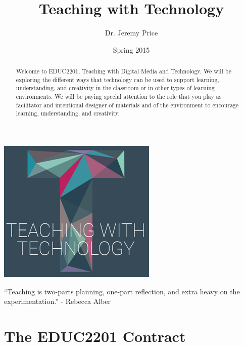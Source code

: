 \documentclass{tufte-handout}
\title{Teaching with Technology}
\author{Dr. Jeremy Price}
\date{Spring 2015}  %
\begin{document}
\maketitle%


\begin{abstract}
Welcome to EDUC2201, Teaching with Digital Media and Technology. We will be exploring the different ways that technology can be used to support learning, understanding, and creativity in the classroom or in other types of learning environments. We will be paying special attention to the role that you play as facilitator and intentional designer of materials and of the environment to encourage learning, understanding, and creativity.\end{abstract}

\bigskip

\begin{fullwidth}
\begin{center}

	\includegraphics[width=0.20\linewidth]{twt-logo.png}

	\bigskip

	\Large
	\enquote{Teaching is two-parts planning, one-part reflection, and extra heavy on the experimentation.} - Rebecca Alber

	\normalsize
\end{center}
\end{fullwidth}



\newpage

\part{The EDUC2201 Contract}
\begin{fullwidth}



\end{fullwidth}
\newpage
\end{document}
